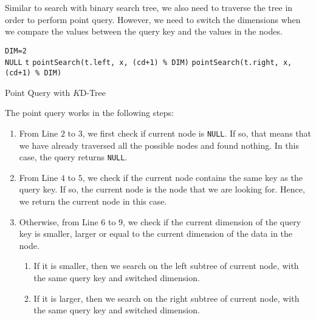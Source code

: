 Similar to search with binary search tree, we also need to traverse the tree in order to perform point query. However, we need to switch the dimensions when we compare the values between the query key and the values in the nodes.

\begin{algorithm}[H]
    \SetAlgoLined
    \texttt{DIM=2}\\
     {
    	\Return \texttt{NULL}
    }
     {
    	\Return \texttt{t}
    }
     {
    	\Return \texttt{pointSearch(t.left, x, (cd+1) \% DIM)}
    }
     {
    	\Return \texttt{pointSearch(t.right, x, (cd+1) \% DIM)}
    }
    \caption{Point Query with $K$D-Tree}
    \label{algo: point_query_kdtree}
\end{algorithm}

The point query works in the following steps:

\begin{enumerate}
	\item From Line $2$ to $3$, we first check if current node is \texttt{NULL}. If so, that means that we have already traversed all the possible nodes and found nothing. In this case, the query returns \texttt{NULL}.
	\item From Line $4$ to $5$, we check if the current node contains the same key as the query key. If so, the current node is the node that we are looking for. Hence, we return the current node in this case.
	\item Otherwise, from Line $6$ to $9$, we check if the current dimension of the query key is smaller, larger or equal to the current dimension of the data in the node.
	\begin{enumerate}
	\item If it is smaller, then we search on the left subtree of current node, with the same query key and switched dimension.
	\item If it is larger, then we search on the right subtree of current node, with the same query key and switched dimension.
	\end{enumerate}
\end{enumerate}

